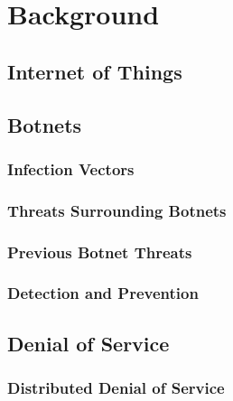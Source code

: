 \chapter{Background}

\section{Internet of Things}



\section{Botnets}



\subsection{Infection Vectors}



\subsection{Threats Surrounding Botnets}



\subsection{Previous Botnet Threats}



\subsection{Detection and Prevention}



\section{Denial of Service}



\subsection{Distributed Denial of Service}

